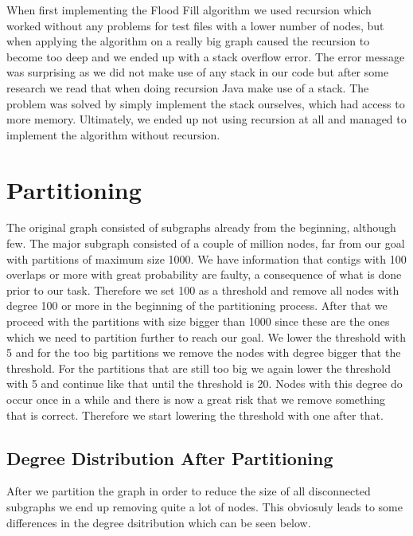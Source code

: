 \documentclass[a4paper,10pt]{article}
\begin{document}
When first implementing the Flood Fill algorithm we used recursion which worked without any problems for test files with a lower number of nodes, but when 
applying the algorithm on a really big graph caused the recursion to become too deep and we ended up with a stack overflow error. 
The error message was surprising as we did not make use of any stack in our code but after some research we read that when doing recursion Java make use of a stack. 
The problem was solved by simply implement the stack ourselves, which had access to more memory. Ultimately, we ended up not using recursion at all and managed 
to implement the algorithm without recursion. 


\section{Partitioning}

The original graph consisted of subgraphs already from the beginning, although few. The major subgraph consisted of a couple of million
nodes, far from our goal with partitions of maximum size 1000. We have information that contigs with 100 overlaps or more with great
probability are faulty, a consequence of what is done prior to our task. Therefore we set 100 as a threshold and remove all nodes with
degree 100 or more in the beginning of the partitioning process. After that we proceed with the partitions with size bigger than 1000
since these are the ones which we need to partition further to reach our goal. We lower the threshold with 5 and for the too big
partitions we remove the nodes with degree bigger that the threshold. For the partitions that are still too big we again lower the
threshold with 5 and continue like that until the threshold is 20. Nodes with this degree do occur once in a while and there is now a
great risk that we remove something that is correct. Therefore we start lowering the threshold with one after that.



\subsection{Degree Distribution After Partitioning}

After we partition the graph in order to reduce the size of all disconnected subgraphs we end up removing quite a lot of nodes. This obviosuly leads to some differences in the degree dsitribution which can be seen below.
\end{document}
